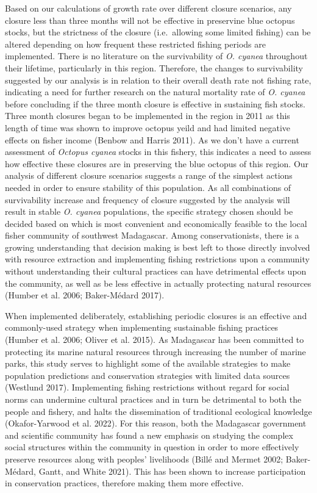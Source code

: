 \documentclass[
]{article}
\begin{document}
Based on our calculations of growth rate over different closure scenarios, any closure less than three months will not be effective in preservine blue octopus stocks, but the strictness of the closure (i.e.~allowing some limited fishing) can be altered depending on how frequent these restricted fishing periods are implemented. There is no literature on the survivability of \emph{O. cyanea} throughout their lifetime, particularly in this region. Therefore, the changes to survivability suggested by our analysis is in relation to their overall death rate not fishing rate, indicating a need for further research on the natural mortality rate of \emph{O. cyanea} before concluding if the three month closure is effective in sustaining fish stocks. Three month closures began to be implemented in the region in 2011 as this length of time was shown to improve octopus yeild and had limited negative effects on fisher income (Benbow and Harris 2011). As we don't have a current assessment of \emph{Octopus cyanea} stocks in this fishery, this indicates a need to assess how effective these closures are in preserving the blue octopus of this region. Our analysis of different closure scenarios suggests a range of the simplest actions needed in order to ensure stability of this population. As all combinations of survivability increase and frequency of closure suggested by the analysis will result in stable \emph{O. cyanea} populations, the specific strategy chosen should be decided based on which is most convenient and economically feasible to the local fisher community of southwest Madagascar. Among conservationists, there is a growing understanding that decision making is best left to those directly involved with resource extraction and implementing fishing restrictions upon a community without understanding their cultural practices can have detrimental effects upon the community, as well as be less effective in actually protecting natural resources (Humber et al. 2006; Baker-Médard 2017).

When implemented deliberately, establishing periodic closures is an effective and commonly-used strategy when implementing sustainable fishing practices (Humber et al. 2006; Oliver et al. 2015). As Madagascar has been committed to protecting its marine natural resources through increasing the number of marine parks, this study serves to highlight some of the available strategies to make population predictions and conservation strategies with limited data sources (Westlund 2017). Implementing fishing restrictions without regard for social norms can undermine cultural practices and in turn be detrimental to both the people and fishery, and halts the dissemination of traditional ecological knowledge (Okafor-Yarwood et al. 2022). For this reason, both the Madagascar government and scientific community has found a new emphasis on studying the complex social structures within the community in question in order to more effectively preserve resources along with peoples' livelihoods (Billé and Mermet 2002; Baker-Médard, Gantt, and White 2021). This has been shown to increase participation in conservation practices, therefore making them more effective.
\end{document}
